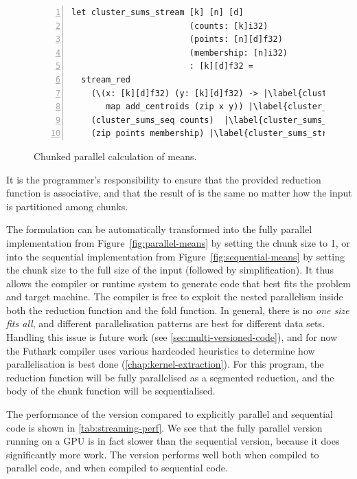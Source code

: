 \begin{figure}
\begin{lstlisting}[numbers=left,escapechar=|,xleftmargin=0pt]
let cluster_sums_stream [k] [n] [d]
                        (counts: [k]i32)
                        (points: [n][d]f32)
                        (membership: [n]i32)
                        : [k][d]f32 =
  stream_red
    (\(x: [k][d]f32) (y: [k][d]f32) -> |\label{cluster_sums_stream_op_begin}|
       map add_centroids (zip x y)) |\label{cluster_sums_stream_op_end}|
    (cluster_sums_seq counts)  |\label{cluster_sums_stream_chunk}|
    (zip points membership) |\label{cluster_sums_stream_zip}|
\end{lstlisting}
\caption{Chunked parallel calculation of means.}
\label{fig:stream-means}
\end{figure}

It is the programmer's responsibility to ensure that the provided
reduction function is associative, and that the result of
\StreamRed{} is the same no matter how the input is partitioned
among chunks.

The \StreamRed{} formulation can be automatically transformed into the
fully parallel implementation from Figure~\ref{fig:parallel-means} by
setting the chunk size to 1, or into the sequential implementation
from Figure~\ref{fig:sequential-means} by setting the chunk size to
the full size of the input (followed by simplification).  It thus
allows the compiler or runtime system to generate code that best fits
the problem and target machine.  The compiler is free to exploit the
nested parallelism inside both the reduction function and the fold
function.  In general, there is no \textit{one size fits all}, and
different parallelisation patterns are best for different data sets.
Handling this issue is future work (see
\cref{sec:multi-versioned-code}), and for now the Futhark compiler
uses various hardcoded heuristics to determine how parallelisation is
best done (\cref{chap:kernel-extraction}).  For this program, the
reduction function will be fully parallelised as a segmented
reduction, and the body of the chunk function will be sequentialised.

The performance of the \StreamRed{} version compared to explicitly
parallel and sequential code is shown in \cref{tab:streaming-perf}.  We
see that the fully parallel version running on a GPU is in fact slower
than the sequential version, because it does significantly more work.
The \StreamRed{} version performs well both when compiled to parallel
code, and when compiled to sequential code.


